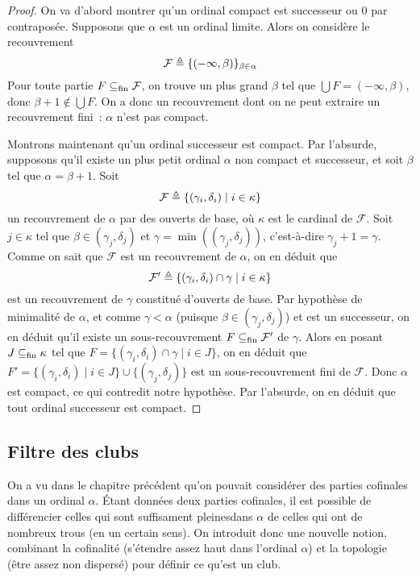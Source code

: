 \begin{proof}
  On va d'abord montrer qu'un ordinal compact est successeur ou $0$ par
  contraposée. Supposons que $\alpha$ est un ordinal limite. Alors on considère
  le recouvrement
  \[\mathcal F \triangleq \{(-\infty,\beta)\}_{\beta \in \alpha}\]
  Pour toute partie $F\subseteq_{\mathrm{fin}}\mathcal F$, on trouve un plus grand $\beta$ tel
  que $\bigcup F = (-\infty,\beta)$, donc $\beta + 1 \notin\bigcup F$. On a
  donc un recouvrement dont on ne peut extraire un recouvrement fini~: $\alpha$
  n'est pas compact.

  Montrons maintenant qu'un ordinal successeur est compact. Par l'absurde,
  supposons qu'il existe un plus petit ordinal $\alpha$ non compact et
  successeur, et soit $\beta$ tel que $\alpha = \beta + 1$. Soit
  \[\mathcal F \triangleq \{(\gamma_i,\delta_i)\mid i \in \kappa\}\]
  un recouvrement de $\alpha$ par des ouverts de base, où $\kappa$ est le
  cardinal de $\mathcal F$. Soit $j \in \kappa$ tel que
  $\beta \in (\gamma_j,\delta_j)$ et $\gamma = \min((\gamma_j,\delta_j))$,
  c'est-à-dire $\gamma_j + 1 = \gamma$. Comme on sait que $\mathcal F$ est un
  recouvrement de $\alpha$, on en déduit que
  \[\mathcal F' \triangleq \{(\gamma_i,\delta_i) \cap \gamma\mid i \in \kappa\}\]
  est un recouvrement de $\gamma$ constitué d'ouverts de base. Par hypothèse de
  minimalité de $\alpha$, et comme $\gamma < \alpha$
  (puisque $\beta \in (\gamma_j,\delta_j)$) et est un successeur, on en déduit
  qu'il existe un sous-recouvrement $F\subseteq_{\mathrm{fin}} \mathcal F'$ de $\gamma$. Alors en
  posant $J\subseteq_{\mathrm{fin}} \kappa$ tel que
  $F = \{(\gamma_i,\delta_i)\cap \gamma \mid i \in J\}$, on en déduit que
  $F' = \{(\gamma_i,\delta_i)\mid i \in J\} \cup \{(\gamma_j,\delta_j)\}$ est
  un sous-recouvrement fini de $\mathcal F$. Donc $\alpha$ est compact, ce qui
  contredit notre hypothèse. Par l'absurde, on en déduit que tout ordinal
  successeur est compact.
\end{proof}

\subsection{Filtre des clubs}

On a vu dans le chapitre précédent qu'on pouvait considérer des parties
cofinales dans un ordinal $\alpha$. \'Etant données deux parties cofinales,
il est possible de différencier celles qui sont \og suffisament pleines\fg dans
$\alpha$ de celles qui ont de nombreux trous (en un certain sens). On introduit
donc une nouvelle notion, combinant la cofinalité (s'étendre assez haut dans
l'ordinal $\alpha$) et la topologie (être assez non dispersé) pour définir ce
qu'est un club.

